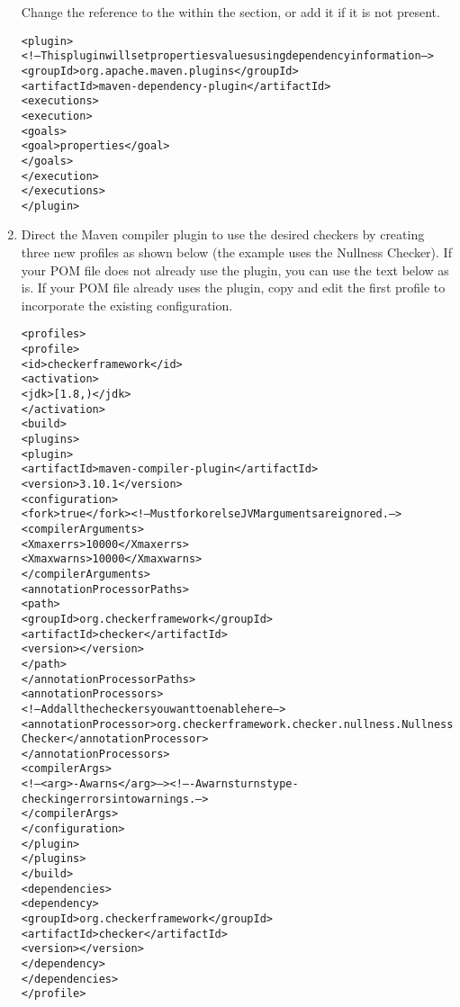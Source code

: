 \begin{enumerate}
Change the reference to the  within the 
section, or add it if it is not present.

\begin{alltt}
  <plugin>
    <!-- This plugin will set properties values using dependency information -->
    <groupId>org.apache.maven.plugins</groupId>
    <artifactId>maven-dependency-plugin</artifactId>
    <executions>
      <execution>
        <goals>
          <goal>properties</goal>
        </goals>
      </execution>
    </executions>
  </plugin>
\end{alltt}

\item Direct the Maven compiler plugin to use the desired checkers by
  creating three new profiles as shown below (the example uses the Nullness
  Checker).  If your POM file does not already use the
   plugin, you can use the text below as is.
  If your POM file
  already uses the plugin, copy and edit the first profile to incorporate the
  existing configuration.


\begin{mysmall}
\begin{alltt}
  <profiles>
    <profile>
      <id>checkerframework</id>
      <activation>
        <jdk>[1.8,)</jdk>
      </activation>
      <build>
        <plugins>
          <plugin>
            <artifactId>maven-compiler-plugin</artifactId>
            <version>3.10.1</version>
            <configuration>
              <fork>true</fork> <!-- Must fork or else JVM arguments are ignored. -->
              <compilerArguments>
                <Xmaxerrs>10000</Xmaxerrs>
                <Xmaxwarns>10000</Xmaxwarns>
              </compilerArguments>
              <annotationProcessorPaths>
                <path>
                  <groupId>org.checkerframework</groupId>
                  <artifactId>checker</artifactId>
                  <version>\ReleaseVersion{}</version>
                </path>
              </annotationProcessorPaths>
              <annotationProcessors>
                <!-- Add all the checkers you want to enable here -->
                <annotationProcessor>org.checkerframework.checker.nullness.NullnessChecker</annotationProcessor>
              </annotationProcessors>
              <compilerArgs>
                <!-- <arg>-Awarns</arg> --> <!-- -Awarns turns type-checking errors into warnings. -->
              </compilerArgs>
            </configuration>
          </plugin>
        </plugins>
      </build>
      <dependencies>
        <dependency>
          <groupId>org.checkerframework</groupId>
          <artifactId>checker</artifactId>
          <version>\ReleaseVersion{}</version>
        </dependency>
      </dependencies>
    </profile>


\end{alltt}
\end{mysmall}
\end{enumerate}
